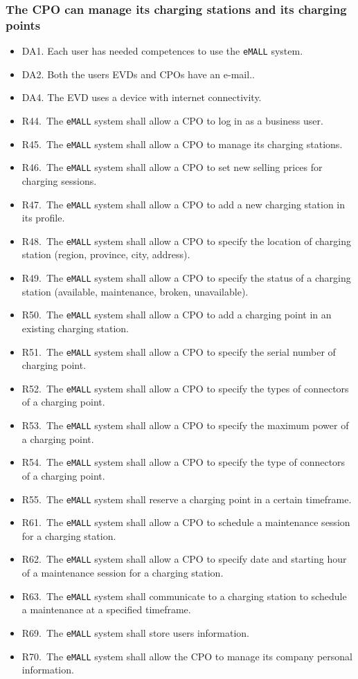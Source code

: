 \subsubsection{The CPO can manage its charging stations and its charging points}
\begin{itemize}
    \item DA1. Each user has needed competences to use the \verb|eMALL| system.
    \item DA2. Both the users EVDs and CPOs have an e-mail..
    \item DA4. The EVD uses a device with internet connectivity.
    \item R44.\ The \verb|eMALL| system shall allow a CPO to log in as a business user.
    \item R45.\ The \verb|eMALL| system shall allow a CPO to manage its charging stations.
    \item R46.\ The \verb|eMALL| system shall allow a CPO to set new selling prices for charging sessions.
    \item R47.\ The \verb|eMALL| system shall allow a CPO to add a new charging station in its profile.
    \item R48.\ The \verb|eMALL| system shall allow a CPO to specify the location of charging station
    (region, province, city, address).
    \item R49.\ The \verb|eMALL| system shall allow a CPO to specify the status of a charging station
    (available, maintenance, broken, unavailable).
    \item R50.\ The \verb|eMALL| system shall allow a CPO to add a charging point in an existing
    charging station.
    \item R51.\ The \verb|eMALL| system shall allow a CPO to specify the serial number of charging
    point.
    \item R52.\ The \verb|eMALL| system shall allow a CPO to specify the types of connectors of a
    charging point.
    \item R53.\ The \verb|eMALL| system shall allow a CPO to specify the maximum power of a charging
    point.
    \item R54.\ The \verb|eMALL| system shall allow a CPO to specify the type of connectors of a
    charging point.
    \item R55.\ The \verb|eMALL| system shall reserve a charging point in a certain timeframe.
    \item R61.\ The \verb|eMALL| system shall allow a CPO to schedule a maintenance session for a
    charging station.
    \item R62.\ The \verb|eMALL| system shall allow a CPO to specify date and starting hour of a
    maintenance session for a charging station.
    \item R63.\ The \verb|eMALL| system shall communicate to a charging station to schedule a maintenance at a specified timeframe.
    \item R69.\ The \verb|eMALL| system shall store users information.
    \item R70.\ The \verb|eMALL| system shall allow the CPO to manage its company personal information.
\end{itemize}

